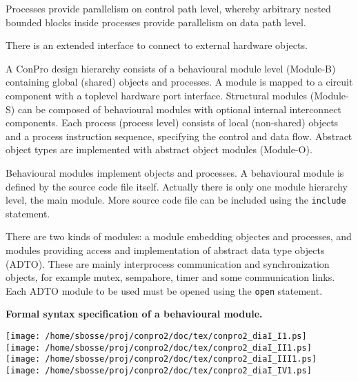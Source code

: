 \documentclass[a4paper,12pt,twoside,english]{article}
\begin{document}
\vskip5pt
Processes provide parallelism on control path level, whereby arbitrary nested bounded blocks inside processes provide parallelism on data path level.


\vskip5pt
There is an extended interface to connect to external hardware objects. 


\vskip5pt



\vskip5pt
 


\def\thesubsubsection{\vrule width 0pt height 1.3 ex}

\def\thesubsection{\tocVIII}
\secII{\label{toclabelVIII}\thesubsection}
A ConPro design hierarchy consists of a behavioural module level (Module-B) containing global (shared)
objects and processes. A module is mapped to a circuit component with a toplevel hardware port interface. Structural modules (Module-S) can be composed of
behavioural modules with optional internal interconnect components. Each process (process level) consists of local (non-shared) objects and a process
instruction sequence, specifying the control and data flow. Abstract object types are implemented with abstract object modules (Module-O).


\vskip5pt



\vskip5pt

\def\thesubsubsection{\tocIX}
\secIII{\label{toclabelIX}\thesubsubsection}
Behavioural modules implement objects and processes. A behavioural module  is defined by the source
code file itself. Actually there is only one module hierarchy level, the main module. More source code file can be included using the {\tt include} statement. 


\vskip5pt
There are two kinds of modules: a module embedding objectes and processes, and modules providing access and implementation of abstract data type objects (ADTO).
These are mainly interprocess communication and synchronization objects, for example mutex, sempahore, timer and some communication links. Each ADTO module to
be used must be opened using the {\tt open} statement.


\vskip5pt
\def\defcontent{
\begin{center}
\texttt{[image: /home/sbosse/proj/conpro2/doc/tex/conpro2\_diaI\_I1.ps]}\\\vskip3pt
\texttt{[image: /home/sbosse/proj/conpro2/doc/tex/conpro2\_diaI\_II1.ps]}\\\vskip3pt
\texttt{[image: /home/sbosse/proj/conpro2/doc/tex/conpro2\_diaI\_III1.ps]}\\\vskip3pt
\texttt{[image: /home/sbosse/proj/conpro2/doc/tex/conpro2\_diaI\_IV1.ps]}\\\vskip3pt
\end{center}
}
\def\defdescription{
\caption{\bf Formal syntax specification of a behavioural  module.
}
\label{def:1}}
\begin{definition}[H]\let\normalsize\footnotesize \normalsize
\defdescription
\end{definition}
\defcontent
\end{document}
